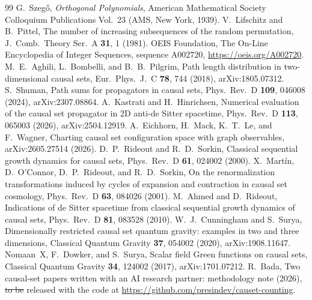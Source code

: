 \documentclass[prd,twocolumn,superscriptaddress,nofootinbib,amsmath,amssymb,floatfix]{revtex4-2}
\makeatletter
\providecommand{\DIFdeltex}[1]{{\protect\color{red}\sout{#1}}} %
\providecommand{\DIFdelbegin}{} %
\providecommand{\DIFdelend}{} %
\providecommand{\DIFdel}[1]{\texorpdfstring{\DIFdeltex{#1}}{}} %
\providecommand{\DIFscaledelfig}{0.5}
\newlength{\DIFdelgraphicswidth} %
\newlength{\DIFdelgraphicsheight} %
\providecommand{\DIFdelincludegraphics}[2][]{%
\sbox{\DIFdelgraphicsbox}{\DIFOincludegraphics[#1]{#2}}%
\settoboxwidth{\DIFdelgraphicswidth}{\DIFdelgraphicsbox} %
\settoboxtotalheight{\DIFdelgraphicsheight}{\DIFdelgraphicsbox} %
\scalebox{\DIFscaledelfig}{%
\parbox[b]{\DIFdelgraphicswidth}{\usebox{\DIFdelgraphicsbox}\\[-\baselineskip] \rule{\DIFdelgraphicswidth}{0em}}\llap{\resizebox{\DIFdelgraphicswidth}{\DIFdelgraphicsheight}{%
\setlength{\unitlength}{\DIFdelgraphicswidth}%
\begin{picture}(1,1)%
\thicklines\linethickness{2pt} %
{\color[rgb]{1,0,0}\put(0,0){\framebox(1,1){}}}%
{\color[rgb]{1,0,0}\put(0,0){\line( 1,1){1}}}%
{\color[rgb]{1,0,0}\put(0,1){\line(1,-1){1}}}%
\end{picture}%
}\hspace*{3pt}}} %
} %
\DeclareRobustCommand{\DIFdelbegin}{\DIFOdelbegin \let\includegraphics\DIFdelincludegraphics} %
\DeclareRobustCommand{\DIFdelend}{\DIFOaddend \let\includegraphics\DIFOincludegraphics} %
\let\sout@orig\sout %
\renewcommand{\sout}[1]{\ifmmode\text{\sout@orig{\ensuremath{#1}}}\else\sout@orig{#1}\fi} %
\makeatother
\begin{document}
\begin{thebibliography}{99}
 G.~Szeg\H{o}, \emph{Orthogonal Polynomials}, American Mathematical Society Colloquium Publications Vol.~23 (AMS, New York, 1939).
 V.~Lifschitz and B.~Pittel, The number of increasing subsequences of the random permutation, J.\ Comb.\ Theory Ser.\ A \textbf{31}, 1 (1981).
 OEIS Foundation, The On-Line Encyclopedia of Integer Sequences, sequence A002720, \url{https://oeis.org/A002720}.
 M.~E.~Aghili, L.~Bombelli, and B.~B.~Pilgrim, Path length distribution in two-dimensional causal sets, Eur.\ Phys.\ J.\ C \textbf{78}, 744 (2018), arXiv:1805.07312.
 S.~Shuman, Path sums for propagators in causal sets, Phys.\ Rev.\ D \textbf{109}, 046008 (2024), arXiv:2307.08864.
 A.~Kastrati and H.~Hinrichsen, Numerical evaluation of the causal set propagator in 2D anti-de Sitter spacetime, Phys.\ Rev.\ D \textbf{113}, 065003 (2026), arXiv:2504.12919.
 A.~Eichhorn, H.~Mack, K.~T.~Le, and F.~Wagner, Charting causal set configuration space with graph observables, arXiv:2605.27514 (2026).
 D.~P.~Rideout and R.~D.~Sorkin, Classical sequential growth dynamics for causal sets, Phys.\ Rev.\ D \textbf{61}, 024002 (2000).
 X.~Mart\'in, D.~O'Connor, D.~P.~Rideout, and R.~D.~Sorkin, On the renormalization transformations induced by cycles of expansion and contraction in causal set cosmology, Phys.\ Rev.\ D \textbf{63}, 084026 (2001).
 M.~Ahmed and D.~Rideout, Indications of de Sitter spacetime from classical sequential growth dynamics of causal sets, Phys.\ Rev.\ D \textbf{81}, 083528 (2010).
 W.~J.~Cunningham and S.~Surya, Dimensionally restricted causal set quantum gravity: examples in two and three dimensions, Classical Quantum Gravity \textbf{37}, 054002 (2020), arXiv:1908.11647.
 Nomaan~X, F.~Dowker, and S.~Surya, Scalar field Green functions on causal sets, Classical Quantum Gravity \textbf{34}, 124002 (2017), arXiv:1701.07212.
 R.~Bada, Two causal-set papers written with an AI research partner: methodology note (2026), \DIFdelbegin \DIFdel{to be }\DIFdelend released with the code at \url{https://github.com/presindev/causet-counting}.
\end{thebibliography}
\end{document}
